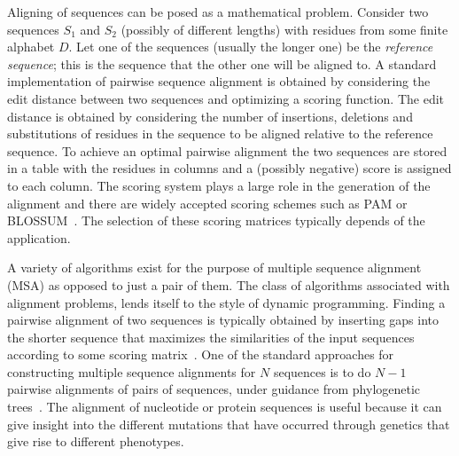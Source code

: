 
Aligning of sequences can be posed as a mathematical problem. Consider two sequences $S_1$ and $S_2$ (possibly of different lengths) with residues from some finite alphabet $D$. Let one of the sequences (usually the longer one) be the \textit{reference sequence}; this is the sequence that the other one will be aligned to.
A standard implementation of pairwise sequence alignment is obtained by considering the edit distance between two sequences and optimizing a scoring function. The edit distance is obtained by considering the number of insertions, deletions and substitutions of residues in the sequence to be aligned relative to the reference sequence. To achieve an optimal pairwise alignment the two sequences are stored in a table with the residues in columns and a (possibly negative) score is assigned to each column. %
The scoring system plays a large role in the generation of the alignment and there are widely accepted scoring schemes such as PAM or BLOSSUM~\cite{mount2008comparison}. The selection of these scoring matrices typically depends of the application.

A variety of algorithms exist for the purpose of multiple sequence alignment (MSA) as opposed to just a pair of them. The class of algorithms associated with alignment problems, lends itself to the style of dynamic programming. Finding a pairwise alignment of two sequences is typically obtained by inserting gaps into the shorter sequence that maximizes the similarities of the input sequences according to some scoring matrix~\cite{edgar2006multiple}. One of the standard approaches for constructing multiple sequence alignments for $N$ sequences is to do $N-1$ pairwise alignments of pairs of sequences, under guidance from phylogenetic trees~\cite{feng1987progressive}.
	The alignment of nucleotide or protein sequences is useful because it can give insight into the different mutations that have occurred through genetics that give rise to different phenotypes. 


